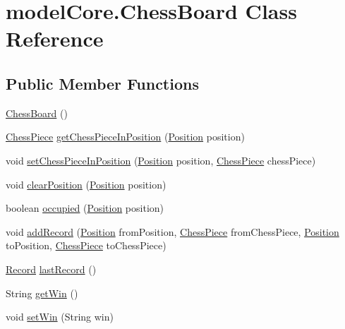 \hypertarget{classmodel_core_1_1_chess_board}{\section{model\+Core.\+Chess\+Board Class Reference}
\label{classmodel_core_1_1_chess_board}
}
\subsection*{Public Member Functions}
\begin{DoxyCompactItemize}
\item 
\hyperlink{classmodel_core_1_1_chess_board_a50f1163eb1a59a7193668a8d1cf89435}{Chess\+Board} ()
\item 
\hyperlink{classmodel_chess_pieces_1_1_chess_piece}{Chess\+Piece} \hyperlink{classmodel_core_1_1_chess_board_ad700d180ac71927b8fd0e5c3e09ddd2b}{get\+Chess\+Piece\+In\+Position} (\hyperlink{classmodel_core_1_1_position}{Position} position)
\item 
void \hyperlink{classmodel_core_1_1_chess_board_af1a00d0d402bde8b8b5e5a23a96e6374}{set\+Chess\+Piece\+In\+Position} (\hyperlink{classmodel_core_1_1_position}{Position} position, \hyperlink{classmodel_chess_pieces_1_1_chess_piece}{Chess\+Piece} chess\+Piece)
\item 
void \hyperlink{classmodel_core_1_1_chess_board_a59800c1635a93d08909d34814bfffd20}{clear\+Position} (\hyperlink{classmodel_core_1_1_position}{Position} position)
\item 
boolean \hyperlink{classmodel_core_1_1_chess_board_abf420a5f1ea25fe7a8c6cdce3427c0af}{occupied} (\hyperlink{classmodel_core_1_1_position}{Position} position)
\item 
void \hyperlink{classmodel_core_1_1_chess_board_af36430e89b73d56b322509621d8b27ee}{add\+Record} (\hyperlink{classmodel_core_1_1_position}{Position} from\+Position, \hyperlink{classmodel_chess_pieces_1_1_chess_piece}{Chess\+Piece} from\+Chess\+Piece, \hyperlink{classmodel_core_1_1_position}{Position} to\+Position, \hyperlink{classmodel_chess_pieces_1_1_chess_piece}{Chess\+Piece} to\+Chess\+Piece)
\item 
\hyperlink{classmodel_core_1_1_record}{Record} \hyperlink{classmodel_core_1_1_chess_board_ae899ac8bc62aaf23e4724870932ac6bf}{last\+Record} ()
\item 
String \hyperlink{classmodel_core_1_1_chess_board_a34e37f076c55fdc46d66ac2dc0280267}{get\+Win} ()
\item 
void \hyperlink{classmodel_core_1_1_chess_board_a504f3ee56db184a7e2d8a0aa0b4da1a5}{set\+Win} (String win)
\end{DoxyCompactItemize}


